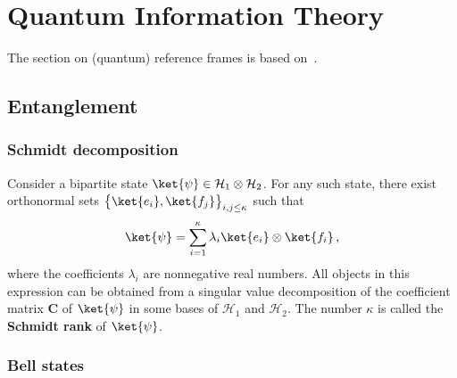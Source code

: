 \chapter{Quantum Information Theory}\label{chapter:quantum_computing}

    The section on (quantum) reference frames is based on~\citet{de_la_hamette_quantum_2020}.

    \minitoc

\section{Entanglement}
\subsection{Schmidt decomposition}

    \begin{construct}
        Consider a bipartite state $\ket{\psi}\in\mathcal{H}_1\otimes\mathcal{H}_2$. For any such state, there exist orthonormal sets $\bigl\{\ket{e_i},\ket{f_j}\bigr\}_{i,j\leq\kappa}$ such that
        \begin{gather}
            \ket{\psi} = \sum_{i=1}^\kappa\lambda_i\ket{e_i}\otimes\ket{f_i}\,,
        \end{gather}
        where the coefficients $\lambda_i$ are nonnegative real numbers. All objects in this expression can be obtained from a singular value decomposition of the coefficient matrix $\mathbf{C}$ of $\ket{\psi}$ in some bases of $\mathcal{H}_1$ and $\mathcal{H}_2$. The number $\kappa$ is called the \textbf{Schmidt rank} of $\ket{\psi}$.
    \end{construct}


\subsection{Bell states}

